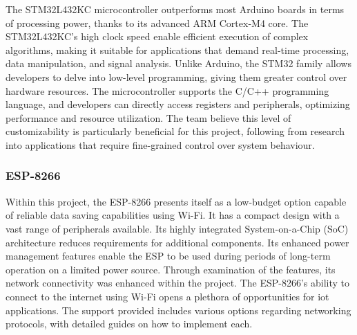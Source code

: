 \documentclass [12pt]{article}
\begin{document}
The STM32L432KC microcontroller outperforms most Arduino boards in terms of processing power, thanks to its advanced ARM Cortex-M4 core. The STM32L432KC's high clock speed enable efficient execution of complex algorithms, making it suitable for applications that demand real-time processing, data manipulation, and signal analysis. Unlike Arduino, the STM32 family allows developers to delve into low-level programming, giving them greater control over hardware resources. The microcontroller supports the C/C++ programming language, and developers can directly access registers and peripherals, optimizing performance and resource utilization. The team believe this level of customizability is particularly beneficial for this project, following from research into applications that require fine-grained control over system behaviour.

\subsubsection{ESP-8266}
Within this project, the ESP-8266 presents itself as a low-budget option capable of reliable data saving capabilities using Wi-Fi. It has a compact design with a vast range of peripherals available. Its highly integrated System-on-a-Chip (SoC) architecture reduces requirements for additional components. Its enhanced power management features enable the ESP to be used during periods of long-term operation on a limited power source. Through examination of the features, its network connectivity was enhanced within the project. The ESP-8266’s ability to connect to the internet using Wi-Fi opens a plethora of opportunities for \gls{iot} applications. The support provided includes various options regarding networking protocols, with detailed guides on how to implement each.
\end{document}
